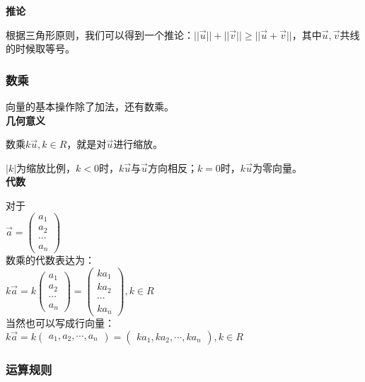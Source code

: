 \documentclass[UTF8]{ctexart}
\begin{document}
\textbf{推论}

根据三角形原则，我们可以得到一个推论：$||\vec{u}||+||\vec{v}|| \geq ||\vec{u} + \vec{v}||$，其中$\vec{u},\vec{v}$共线的时候取等号。

\subsubsection{数乘}

向量的基本操作除了加法，还有数乘。\\

\textbf{几何意义}

数乘$k\vec{u},k \in R$，就是对$\vec{u}$进行缩放。

$|k|$为缩放比例，$k<0$时，$k\vec{u}$与$\vec{u}$方向相反；$k=0$时，$k\vec{u}$为零向量。\\

\textbf{代数}

对于\\

$\vec{a}=\begin{pmatrix} a_{1} \\ a_{2} \\ \cdots \\ a_{n} \end{pmatrix}$ \\

数乘的代数表达为：\\

$k\vec{a}=k\begin{pmatrix} a_{1} \\ a_{2} \\ \cdots \\ a_{n} \end{pmatrix}
=\begin{pmatrix} ka_{1} \\ ka_{2} \\ \cdots \\ ka_{n} \end{pmatrix},k \in R$\\

当然也可以写成行向量：\\

$k\vec{a}=k\begin{pmatrix} a_{1},a_{2},\cdots,a_{n} \end{pmatrix}=\begin{pmatrix} ka_{1},ka_{2},\cdots,ka_{n} \end{pmatrix},k \in R$

\subsubsection{运算规则}
\end{document}
